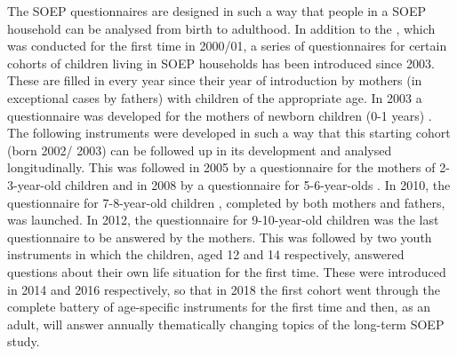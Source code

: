 \documentclass[letterpaper,10pt,openany,onesideH,english]{sphinxmanual}
\begin{document}
The SOEP questionnaires are designed in such a way that people in a SOEP household can be analysed from birth to adulthood.
In addition to the {\hyperref[\detokenize{Contents of SOEPcore/index:youth-questionnaire}]{}}, which was conducted for the first time in 2000/01, a series of questionnaires for certain cohorts of children living in SOEP households has been introduced since 2003. These are filled in every year since their year of introduction by mothers (in exceptional cases by fathers) with children of the appropriate age. In 2003 a questionnaire was developed for the mothers of newborn children (0-1 years) {\hyperref[\detokenize{Contents of SOEPcore/index:mother-child-questionnaire-a}]{}}. The following instruments were developed in such a way that this starting cohort (born 2002/ 2003) can be followed up in its development and analysed longitudinally. This was followed in 2005 by a questionnaire for the mothers of 2-3-year-old children {\hyperref[\detokenize{Contents of SOEPcore/index:mother-child-questionnaire-b}]{}} and in 2008 by a questionnaire for 5-6-year-olds {\hyperref[\detokenize{Contents of SOEPcore/index:mother-child-questionnaire-c}]{}}. In 2010, the questionnaire for 7-8-year-old children {\hyperref[\detokenize{Contents of SOEPcore/index:parents-d}]{}}, completed by both mothers and fathers, was launched. In 2012, the questionnaire for 9-10-year-old children {\hyperref[\detokenize{Contents of SOEPcore/index:mother-child-questionnaire-e}]{}} was the last questionnaire to be answered by the mothers. This was followed by two youth instruments in which the children, aged 12 {\hyperref[\detokenize{Contents of SOEPcore/index:pupils-questionnaire}]{}} and 14 {\hyperref[\detokenize{Contents of SOEPcore/index:early-youth-questionnaire}]{}} respectively, answered questions about their own life situation for the first time. These were introduced in 2014 and 2016 respectively, so that in 2018 the first cohort went through the complete battery of age-specific instruments for the first time and then, as an adult, will answer annually thematically changing topics of the long-term SOEP study.
\end{document}
